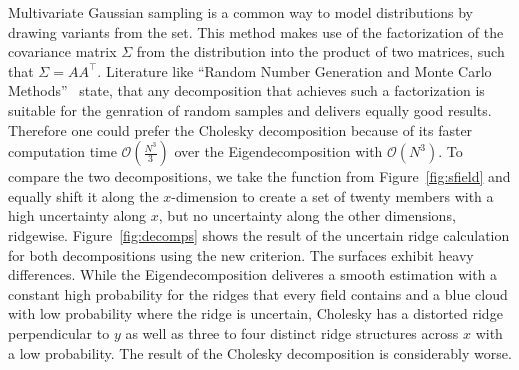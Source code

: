 Multivariate Gaussian sampling is a common way to model distributions
by drawing variants from the set. This method makes use of the
factorization of the covariance matrix $\Sigma$ from the distribution into
the product of two matrices, such that $\Sigma = AA^\top$. Literature
like ``Random Number Generation and Monte Carlo Methods''~\cite{Monte}
state, that any decomposition that achieves such a factorization is
suitable for the genration of random samples and delivers equally
good results. Therefore one could prefer the Cholesky decomposition
because of its faster computation time $\mathcal{O}(\frac{N^3}{3})$ over
the Eigendecomposition with $\mathcal{O}(N^3)$. To compare the two
decompositions, we take the function from Figure~\ref{fig:sfield} and
equally shift it along the $x$-dimension to create a set of twenty
members with a high uncertainty along $x$, but no uncertainty along
the other dimensions, ridgewise. Figure~\ref{fig:decomps} shows the
result of the uncertain ridge calculation for both decompositions using
the new criterion. The surfaces exhibit heavy differences. While the
Eigendecomposition deliveres a smooth estimation with a constant high
probability for the ridges that every field contains and a blue cloud
with low probability where the ridge is uncertain, Cholesky has a
distorted ridge perpendicular to $y$ as well as three to four distinct
ridge structures across $x$ with a low probability. The result of the
Cholesky decomposition is considerably worse.\\
